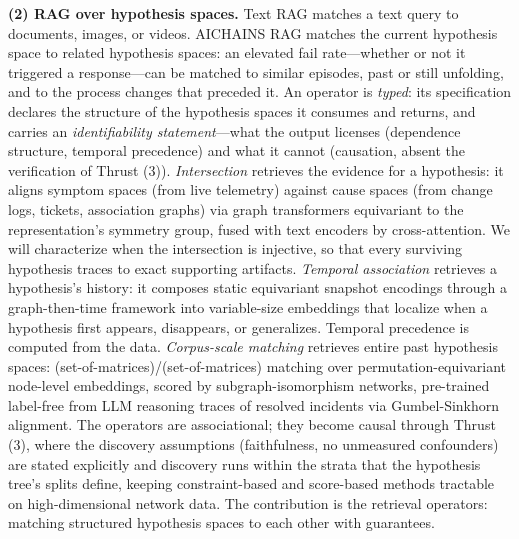 \documentclass[12pt]{article}
\begin{document}
\textbf{(2) RAG over hypothesis spaces.} Text RAG matches a text query to documents, images, or videos. AICHAINS RAG matches the current hypothesis space to related hypothesis spaces: an elevated fail rate---whether or not it triggered a response---can be matched to similar episodes, past or still unfolding, and to the process changes that preceded it. An operator is \emph{typed}: its specification declares the structure of the hypothesis spaces it consumes and returns, and carries an \emph{identifiability statement}---what the output licenses (dependence structure, temporal precedence) and what it cannot (causation, absent the verification of Thrust (3)). \emph{Intersection} retrieves the evidence for a hypothesis: it aligns symptom spaces (from live telemetry) against cause spaces (from change logs, tickets, association graphs) via graph transformers equivariant to the representation's symmetry group, fused with text encoders by cross-attention. We will characterize when the intersection is injective, so that every surviving hypothesis traces to exact supporting artifacts. \emph{Temporal association} retrieves a hypothesis's history: it composes static equivariant snapshot encodings through a graph-then-time framework into variable-size embeddings that localize when a hypothesis first appears, disappears, or generalizes. Temporal precedence is computed from the data. \emph{Corpus-scale matching} retrieves entire past hypothesis spaces: (set-of-matrices)/(set-of-matrices) matching over permutation-equivariant node-level embeddings, scored by subgraph-isomorphism networks, pre-trained label-free from LLM reasoning traces of resolved incidents via Gumbel-Sinkhorn alignment. The operators are associational; they become causal through Thrust (3), where the discovery assumptions (faithfulness, no unmeasured confounders) are stated explicitly and discovery runs within the strata that the hypothesis tree's splits define, keeping constraint-based and score-based methods tractable on high-dimensional network data. The contribution is the retrieval operators: matching structured hypothesis spaces to each other with guarantees.
\end{document}
